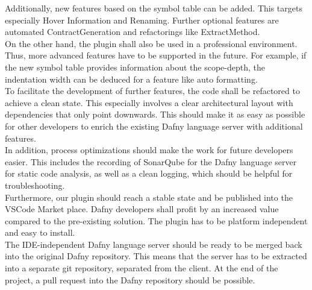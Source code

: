 Additionally, new features based on the symbol table can be added.
This targets especially Hover Information and Renaming.
Further optional features are automated ContractGeneration and refactorings like ExtractMethod. \\

On the other hand, the plugin shall also be used in a professional environment.
Thus, more advanced features have to be supported in the future.
For example, if the new symbol table provides information about the scope-depth, the indentation width can be deduced for a feature like auto formatting.\\

To facilitate the development of further features, the code shall be refactored to achieve a clean state.
This especially involves a clear architectural layout with dependencies that only point downwards.
This should make it as easy as possible for other developers to enrich the existing Dafny language server with additional features. \\

In addition, process optimizations should make the work for future developers easier.
This includes the recording of SonarQube for the Dafny language server for static code analysis,
as well as a clean logging,
which should be helpful for troubleshooting. \\

Furthermore, our plugin should reach a stable state and be published into the VSCode Market place.
Dafny developers shall profit by an increased value compared to the pre-existing solution.
The plugin has to be platform independent and easy to install. \\

The IDE-independent Dafny language server should be ready to be merged back into the original Dafny repository.
This means that the server has to be extracted into a separate git repository, separated from the client.
At the end of the project, a pull request into the Dafny repository should be possible.
